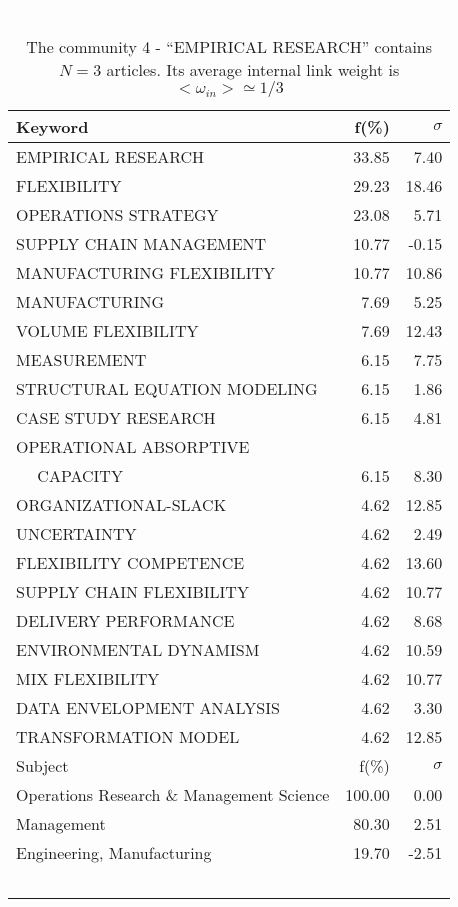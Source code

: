 \documentclass[a4paper,11pt]{report}
\begin{document}
\begin{landscape}
\begin{table}[!ht]
\caption{The community 4 - ``EMPIRICAL RESEARCH'' contains $N = 3$ articles. Its average internal link weight is $<\omega_{in}> \simeq 1/3$ }
\textcolor{white}{aa}\\
{\scriptsize\begin{tabular}{|l r r|}
\hline
Keyword & f(\%) & $\sigma$\\
\hline
EMPIRICAL RESEARCH & 33.85 & 7.40\\
FLEXIBILITY & 29.23 & 18.46\\
OPERATIONS STRATEGY & 23.08 & 5.71\\
SUPPLY CHAIN MANAGEMENT & 10.77 & -0.15\\
MANUFACTURING FLEXIBILITY & 10.77 & 10.86\\
MANUFACTURING & 7.69 & 5.25\\
VOLUME FLEXIBILITY & 7.69 & 12.43\\
MEASUREMENT & 6.15 & 7.75\\
STRUCTURAL EQUATION MODELING & 6.15 & 1.86\\
CASE STUDY RESEARCH & 6.15 & 4.81\\
OPERATIONAL ABSORPTIVE &  & \\
$\quad$ CAPACITY & 6.15 & 8.30\\
ORGANIZATIONAL-SLACK & 4.62 & 12.85\\
UNCERTAINTY & 4.62 & 2.49\\
FLEXIBILITY COMPETENCE & 4.62 & 13.60\\
SUPPLY CHAIN FLEXIBILITY & 4.62 & 10.77\\
DELIVERY PERFORMANCE & 4.62 & 8.68\\
ENVIRONMENTAL DYNAMISM & 4.62 & 10.59\\
MIX FLEXIBILITY & 4.62 & 10.77\\
DATA ENVELOPMENT ANALYSIS & 4.62 & 3.30\\
TRANSFORMATION MODEL & 4.62 & 12.85\\
\hline
\hline
Subject & f(\%) & $\sigma$\\
\hline
Operations Research \& Management Science & 100.00 & 0.00\\
Management & 80.30 & 2.51\\
Engineering, Manufacturing & 19.70 & -2.51\\
 &  & \\
 &  & \\
 &  & \\
 &  & \\
 &  & \\

\end{tabular}}
\end{table}
\end{landscape}
\end{document}
